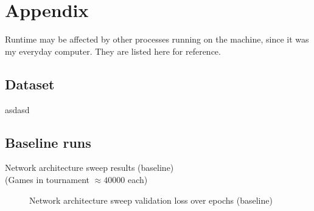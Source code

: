 \appendix

\section{Appendix}

Runtime may be affected by other processes running on the machine, since it was my everyday computer. They are listed here for reference.

\subsection{Dataset}

asdasd

\subsection{Baseline runs}
\label{appendix:baseline}

\begin{table}[H]
\caption{Network architecture sweep results (baseline)\\(Games in tournament $\approx 40000$ each)}
\centering
\begin{adjustbox}{center}

\end{adjustbox}
\end{table}

\begin{figure}[H]
\centering
{}
\caption{Network architecture sweep validation loss over epochs (baseline)}
\end{figure}

